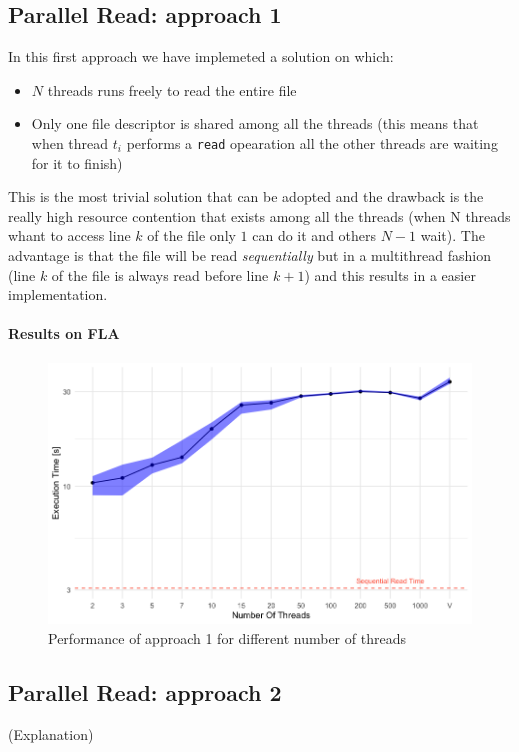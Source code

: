 \documentclass[twocolumn, switch]{article} %
\begin{document}
\subsection{Parallel Read: approach 1}
In this first approach we have implemeted a solution on which:
\begin{itemize}
  \item $N$ threads runs freely to read the entire file
  \item Only one file descriptor is shared among all the threads (this means that
        when thread $t_i$ performs a \texttt{read} opearation all the other threads 
        are waiting for it to finish)
\end{itemize}
This is the most trivial solution that can be adopted and the drawback is the really high
resource contention that exists among all the threads (when N threads whant to access line
$k$ of the file only $1$ can do it and others $N-1$ wait). The advantage is that the file
will be read \textit{sequentially} but in a multithread fashion (line $k$ of the file
is always read before line $k+1$) and this results in a easier implementation.
\paragraph{Results on FLA}
\begin{figure}[ht!]
  \centering
  \includegraphics[width=1\linewidth]{par_read_1_time.png}
  \caption{Performance of approach 1 for different number of threads}
  \label{parread1time}
\end{figure}
\subsection{Parallel Read: approach 2}
(Explanation)
\end{document}
